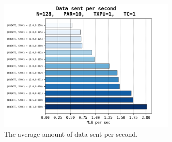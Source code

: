 \documentclass[a4paper,10pt]{article}
\begin{document}
			\begin{figure}[h]
				\centering
				\includegraphics[width=0.8\textwidth]{bar_plots/final_exp1/bytes_sent_per_sec.png}
				\caption{The average amount of data sent per second.}
				\label{fig:delaysBps}
			\end{figure}
		\FloatBarrier
\end{document}
